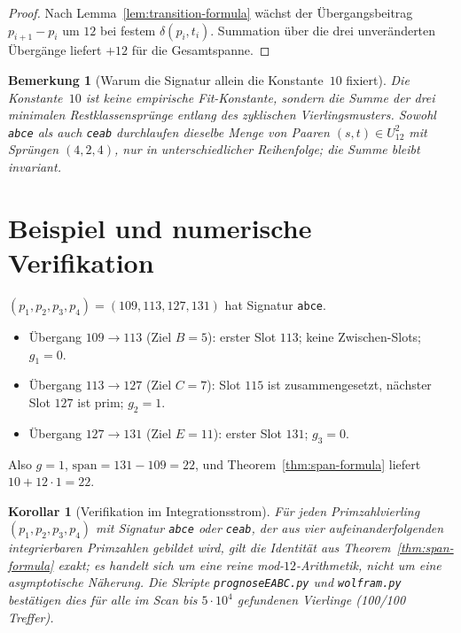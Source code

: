 \documentclass[11pt,a4paper]{article}
\newtheorem{remark}{Bemerkung}
\newtheorem{corollary}[theorem]{Korollar}
\begin{document}
\begin{proof}
Nach Lemma~\ref{lem:transition-formula} wächst der Übergangsbeitrag
$p_{i+1}-p_i$ um $12$ bei festem $\delta(p_i,t_i)$.
Summation über die drei unveränderten Übergänge liefert $+12$ für die Gesamtspanne.
\end{proof}

\begin{remark}[Warum die Signatur allein die Konstante~$10$ fixiert]
Die Konstante~$10$ ist \emph{keine} empirische Fit-Konstante, sondern die
Summe der drei minimalen Restklassensprünge entlang des zyklischen
Vierlingsmusters.
Sowohl \texttt{abce} als auch \texttt{ceab} durchlaufen dieselbe Menge von
Paaren $(s,t) \in U_{12}^2$ mit Sprüngen $(4,2,4)$, nur in unterschiedlicher
Reihenfolge; die Summe bleibt invariant.
\end{remark}

\section{Beispiel und numerische Verifikation}

\begin{example}
\label{ex:quad-6}
$(p_1,p_2,p_3,p_4) = (109,113,127,131)$ hat Signatur \texttt{abce}.
\begin{itemize}
  \item Übergang $109 \to 113$ (Ziel $B=5$): erster Slot $113$; keine Zwischen-Slots;
        $g_1=0$.
  \item Übergang $113 \to 127$ (Ziel $C=7$): Slot $115$ ist zusammengesetzt,
        nächster Slot $127$ ist prim; $g_2=1$.
  \item Übergang $127 \to 131$ (Ziel $E=11$): erster Slot $131$; $g_3=0$.
\end{itemize}
Also $g=1$, $\mathrm{span}=131-109=22$, und Theorem~\ref{thm:span-formula} liefert
$10 + 12\cdot 1 = 22$.
\end{example}

\begin{corollary}[Verifikation im Integrationsstrom]
Für jeden Primzahlvierling $(p_1,p_2,p_3,p_4)$ mit Signatur \texttt{abce} oder
\texttt{ceab}, der aus vier aufeinanderfolgenden integrierbaren Primzahlen
gebildet wird, gilt die Identität aus Theorem~\ref{thm:span-formula}
\emph{exakt}; es handelt sich um eine reine mod-$12$-Arithmetik, nicht um eine
asymptotische Näherung.
Die Skripte \texttt{prognoseEABC.py} und \texttt{wolfram.py} bestätigen dies
für alle im Scan bis $5\cdot 10^4$ gefundenen Vierlinge (100/100 Treffer).
\end{corollary}
\end{document}
